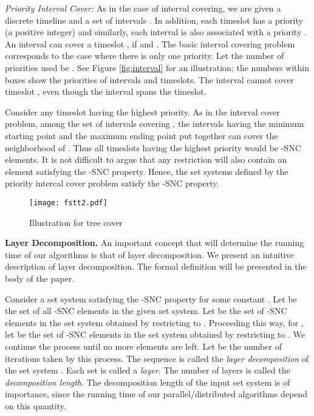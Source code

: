 \documentclass[11pt]{article}
\begin{document}
{\em Priority Interval Cover: }
As in the case of interval covering,
we are given a discrete timeline  and a set of intervals .
In addition, each timeslot  has a priority  (a positive integer)
and similarly, each interval  is also associated with a priority .
An interval  can cover a timeslot , if  and .
The basic interval covering problem corresponds to the case where there is only one priority.
Let the number of priorities used be . See Figure \ref{fig:interval} for an illustration;
the numbers within boxes show the priorities of intervals and timeslots.
The interval  cannot cover timeslot , even though the interval spans the timeslot.

Consider any timeslot  having the highest priority. As in the interval cover problem,
among the set  of intervals covering , the intervals having the minimum starting point
and the maximum ending point put together can cover the neighborhood of .
Thus all timeslots  having the highest priority would be -SNC elements. 
It is not difficult to argue that any restriction will also contain an element satisfying the -SNC property. 
Hence, the set systems defined by the priority intercal cover problem satisfy the -SNC property.

\begin{figure}
\begin{center}
\texttt{[image: fstt2.pdf]}
\caption{Illustration for tree cover}
\label{fig:tree}
\end{center}
\end{figure}


{\bf Layer Decomposition.}
An important concept that will determine the running time of our algorithms is that of layer decomposition.
We present an intuitive description of layer decomposition. 
The formal definition will be presented in the body of the paper.

Consider a set system  satisfying the -SNC property for some constant .
Let  be the set of all -SNC elements in the given set system.
Let  be the set of -SNC elements in the set system obtained by restricting to .
Proceeding this way, for , let  be the set of -SNC elements in the set system 
obtained by restricting to .
We continue the process until no more elements are left.
Let  be the number of iterations taken by this process.
The sequence  is called the {\em layer decomposition} of the set system .
Each set  is called a {\em layer}. The number of layers  is called the {\em decomposition length}.
The decomposition length of the input set system is of importance, since the running time of our parallel/distributed
algorithms depend on this quantity.
\end{document}
